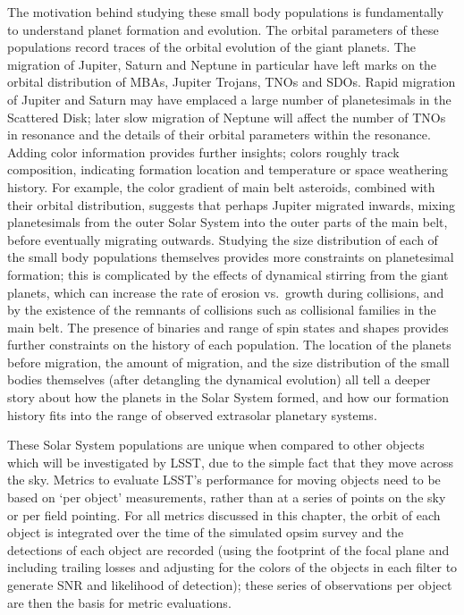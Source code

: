 The motivation behind studying these small body populations is
fundamentally to understand planet formation and evolution. The
orbital parameters of these populations record traces of the orbital
evolution of the giant planets. The migration of Jupiter, Saturn and
Neptune in particular have left marks on the orbital distribution of
MBAs, Jupiter Trojans, TNOs and SDOs. Rapid migration of
Jupiter and Saturn may have emplaced a large number of planetesimals
in the Scattered Disk; later slow migration of Neptune will affect the
number of TNOs in resonance and the details of their orbital parameters
within the resonance. Adding color information provides further
insights; colors roughly track composition, indicating formation
location and temperature or space weathering history. For example, the color
gradient of main belt asteroids, combined with their orbital
distribution, suggests that perhaps Jupiter migrated inwards,
mixing planetesimals from the outer Solar System into the outer parts
of the main belt, before eventually migrating outwards. Studying the
size distribution of each of the small body populations themselves
provides more constraints on planetesimal formation; this is
complicated by the effects of dynamical stirring from the giant
planets, which can increase the rate of erosion vs.\ growth during
collisions, and by the existence of the remnants of collisions such as
collisional families in the main belt. The presence of binaries and range
of spin states and shapes provides further constraints on the history
of each population. The location
of the planets before migration, the amount of migration, and the size
distribution of the small bodies themselves (after detangling the
dynamical evolution) all tell a deeper story about how the planets in
the Solar System formed, and how our formation history fits into the
range of observed extrasolar planetary systems.

These Solar System populations are unique when compared to other
objects which will be investigated by LSST, due to the simple fact
that they move across the sky. Metrics to evaluate
LSST's performance for moving objects need to be based on `per object'
measurements, rather than at a series of points on the sky or per
field pointing. For all metrics discussed in this chapter, the orbit
of each object is integrated over the time of the simulated opsim
survey and the detections of each object are recorded (using the
footprint of the focal plane and including
trailing losses and adjusting for the colors of the objects in each
filter to generate SNR and likelihood of detection); these
series of observations per object are then the basis for metric
evaluations.


